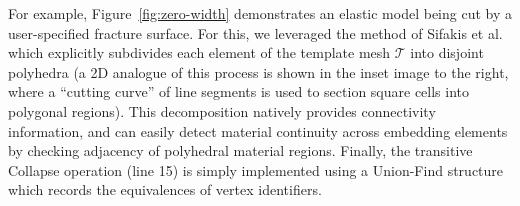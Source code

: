 
For example, Figure~\ref{fig:zero-width} demonstrates an elastic model
being cut by a user-specified fracture surface. For this, we leveraged
the method of Sifakis et al.~ which explicitly
subdivides each element of the template mesh $\mathcal{T}$ into
disjoint polyhedra (a 2D analogue of this process is shown in the
inset image to the right, where a ``cutting curve'' of line segments
is used to section square cells into polygonal regions). This
decomposition natively provides connectivity information, and can
easily detect material continuity across embedding elements by
checking adjacency of polyhedral material regions.  Finally, the
transitive \textsf{Collapse} operation (line 15) is simply implemented
using a \textsf{Union-Find} structure which records the equivalences
of vertex identifiers.



